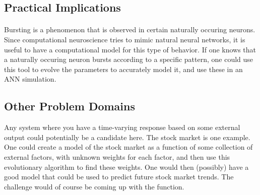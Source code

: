 \documentclass[a4paper,12pt]{article}
\begin{document}
\subsection{Practical Implications}
\paragraph{}Bursting is a phenomenon that is observed in certain naturally occuring neurons. Since computational neuroscience tries to mimic natural neural networks, it is useful to have a computational model for this type of behavior. If one knows that a naturally occuring neuron bursts according to a specific pattern, one could use this tool to evolve the parameters to accurately model it, and use these in an ANN simulation.

\subsection{Other Problem Domains}
Any system where you have a time-varying response based on some external output could potentially be a candidate here. The stock market is one example. One could create a model of the stock market as a function of some collection of external factors, with unknown weights for each factor, and then use this evolutionary algorithm to find these weights. One would then (possibly) have a good model that could be used to predict future stock market trends. The challenge would of course be coming up with the function.
\end{document}
